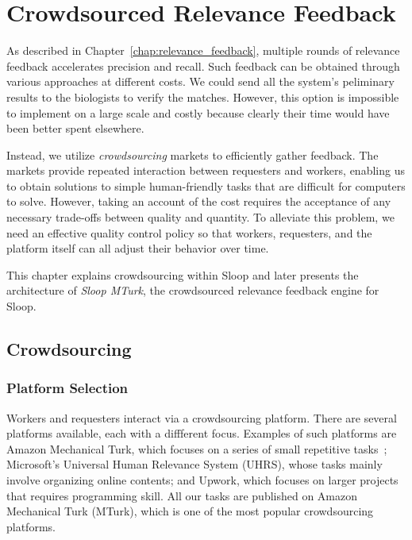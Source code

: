 \graphicspath{{images/chap5/}}
\chapter{Crowdsourced Relevance Feedback}
\label{chap:sloop_mturk}

As described in Chapter~\ref{chap:relevance_feedback}, multiple rounds of
relevance feedback accelerates precision and recall. Such feedback can be 
obtained through various approaches at different costs. We could send all
the system's peliminary results to the biologists to verify the matches.
However, this option is impossible to implement on a large scale and costly
because clearly their time would have been better spent elsewhere.

Instead, we utilize \emph{crowdsourcing} markets to efficiently gather
feedback. The markets provide repeated interaction between requesters and
workers, enabling us to obtain solutions to simple human-friendly tasks that
are difficult for computers to solve. However, taking an account of the cost
requires the acceptance of any necessary trade-offs between quality and
quantity. To alleviate this problem, we need an
effective quality control policy so that workers, requesters, and the platform
itself can all adjust their behavior over time. 

This chapter explains crowdsourcing within Sloop and later presents the
architecture of \emph{Sloop MTurk}, the crowdsourced relevance feedback engine
for Sloop.

\section{Crowdsourcing} %
\label{sec:crowdsourcing}

  \subsection{Platform Selection}

  Workers and requesters interact via a crowdsourcing platform. There are several 
  platforms available, each with a diffferent focus. Examples of such
  platforms are 
  Amazon Mechanical Turk, which focuses on a series of small repetitive
  tasks~\cite{sliv14}; Microsoft's Universal Human Relevance System (UHRS),
  whose tasks mainly involve organizing online contents;
  and Upwork, which focuses on larger projects that requires programming skill.
  All our tasks are published on Amazon Mechanical Turk (MTurk), which is one of the most
  popular crowdsourcing platforms.

